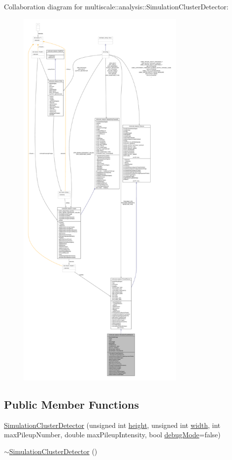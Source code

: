 \-Collaboration diagram for multiscale\-:\-:analysis\-:\-:\-Simulation\-Cluster\-Detector\-:
\nopagebreak
\begin{figure}[H]
\begin{center}
\leavevmode
\includegraphics[height=550pt]{classmultiscale_1_1analysis_1_1SimulationClusterDetector__coll__graph}
\end{center}
\end{figure}
\subsection*{\-Public \-Member \-Functions}
\begin{DoxyCompactItemize}
\item 
\hyperlink{classmultiscale_1_1analysis_1_1SimulationClusterDetector_a5ec24468129dfa9b6a7f38e11a78c69b}{\-Simulation\-Cluster\-Detector} (unsigned int \hyperlink{classmultiscale_1_1analysis_1_1SimulationClusterDetector_a9d0a0fe5d9ea0f2516d07bf44b1da257}{height}, unsigned int \hyperlink{classmultiscale_1_1analysis_1_1SimulationClusterDetector_a4c66a82aa1749dce31c767bc4008d904}{width}, int max\-Pileup\-Number, double max\-Pileup\-Intensity, bool \hyperlink{classmultiscale_1_1analysis_1_1Detector_a4b42f796957efd6ee0b8cf7645494a65}{debug\-Mode}=false)
\item 
\hyperlink{classmultiscale_1_1analysis_1_1SimulationClusterDetector_a8df6b5abd6d2dd48e691bf999d35dd43}{$\sim$\-Simulation\-Cluster\-Detector} ()
\end{DoxyCompactItemize}
